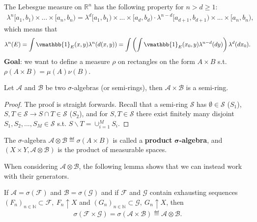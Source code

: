 The Lebesgue measure on \(\mathbb{R}^n\) has the following property for \(n>d\geq1\):
\begin{align*}
    \lambda^n[a_1,b_1) \times  ... \times [a_n, b_n) = 
    \lambda^d[a_1,b_1) \times  ... \times [a_d, b_d) \cdot 
    \lambda^{n-d}[a_{d+1}, b_{d+1})  \times  ... \times [a_n, b_n),
\end{align*}
which means that
\begin{align*}
    \lambda^n(E) = 
    \int\vmathbb{1}_{E}(x,y)\lambda^n(d(x,y))=
    \int\left(\int \vmathbb{1}_{E}(x_0,y)\lambda^{n-d}(dy)\right) \lambda^d(dx_0).
\end{align*}
\textbf{Goal}: we want to define a measure \(\rho\) on rectangles on the form \(A\times B\) s.t. \(\rho(A\times B)=\mu(A)\nu(B)\).
\begin{lemma}
    Let \(\mathscr{A}\) and \(\mathscr{B}\) be two \(\sigma\)-algebras (or semi-rings), then \(\mathscr{A}\times\mathscr{B}\) is a semi-ring.
\end{lemma}
\begin{proof}
    The proof is straight forwards. Recall that a semi-ring \(\mathcal{S}\) has \(\emptyset\in\mathcal{S}\) (\(S_1\)), \(S,T\in \mathcal{S}\rightarrow S\cap T\in\mathcal{S}\) (\(S_2\)), and for \(S,T\in\mathcal{S}\) there exist finitely many disjoint \(S_1, S_2, ..., S_M\in\mathcal{S}\) s.t. \(S\backslash T = \cup_{i=1}^{M}S_i\).
\end{proof}
\begin{definition}
    The \(\sigma\)-algebra \(\mathscr{A}\otimes \mathscr{B}\eqdef \sigma\left(A\times B\right)\) is called a \textbf{product} \(\boldsymbol{\sigma}\)\textbf{-algebra}, and \(\left(X\times Y, \mathscr{A}\otimes\mathscr{B}\right)\) is the product of measurable spaces.
\end{definition}
When considering \(\mathscr{A}\otimes\mathscr{B}\), the following lemma shows that we can instead work with their generators.
\begin{lemma}   \label{lemma:generator_product_sigma}
    If \(\mathscr{A}=\sigma(\mathscr{F})\) and \(\mathscr{B}=\sigma(\mathscr{G})\) and if \(\mathscr{F}\) and \(\mathscr{G}\) contain exhausting sequences \((F_n)_{n\in\mathbb{N}}\subset \mathscr{F}, \ F_n\uparrow X\) and \((G_n)_{n\in\mathbb{N}}\subset \mathscr{G}, \ G_n\uparrow X\), then
    \begin{align*}
        \sigma\left(\mathscr{F}\times \mathscr{G}\right) = \sigma\left(\mathscr{A}\times\mathscr{B}\right) \eqdef \mathscr{A}\otimes\mathscr{B}.
    \end{align*}
\end{lemma}
